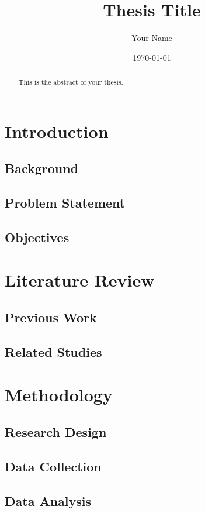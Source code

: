 \documentclass{report}
\title{Thesis Title}
\author{Your Name}
\date{\today}
\begin{document}
\maketitle

\begin{abstract}
This is the abstract of your thesis.
\end{abstract}

\tableofcontents

\chapter{Introduction}
\section{Background}
\section{Problem Statement}
\section{Objectives}

\chapter{Literature Review}
\section{Previous Work}
\section{Related Studies}

\chapter{Methodology}
\section{Research Design}
\section{Data Collection}
\section{Data Analysis}
\end{document}
